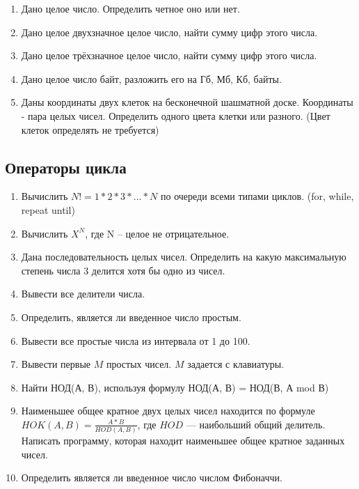 \begin{enumerate}
  \item Дано целое число. Определить четное оно или нет.

  \item Дано целое двухзначное целое число, найти сумму цифр этого числа.

  \item Дано целое трёхзначное целое число, найти сумму цифр этого числа.

  \item Дано целое число байт, разложить его на Гб, Мб, Кб, байты.

  \item Даны координаты двух клеток на бесконечной шашматной доске. Координаты - пара целых чисел. Определить одного цвета клетки или разного. (Цвет клеток определять не требуется)
\end{enumerate}

\subsection{Операторы цикла}

\begin{enumerate}
  \item Вычислить $N! = 1*2*3*...*N$ по очереди всеми типами циклов. (for, while, repeat until)

  \item Вычислить $X^N$, где N -- целое не отрицательное.

  \item Дана последовательность целых чисел. Определить на какую максимальную степень числа 3 делится хотя бы одно из чисел.

  \item Вывести все делители числа.

  \item Определить, является ли введенное число простым.

  \item Вывести все простые числа из интервала от 1 до 100.

  \item Вывести первые $M$ простых чисел. $M$ задается с клавиатуры.

  \item Найти НОД(А, В), используя формулу НОД(А, В) = НОД(В, А mod В)
  
  \item Наименьшее общее кратное двух целых чисел находится по формуле $HOK(A,B)=\frac{A*B}{HOD(A,B)}$, где $HOD$ --- наибольший общий делитель. Написать программу, которая находит наименьшее общее кратное заданных чисел.

  \item Определить является ли введенное число числом Фибоначчи.
\end{enumerate}

